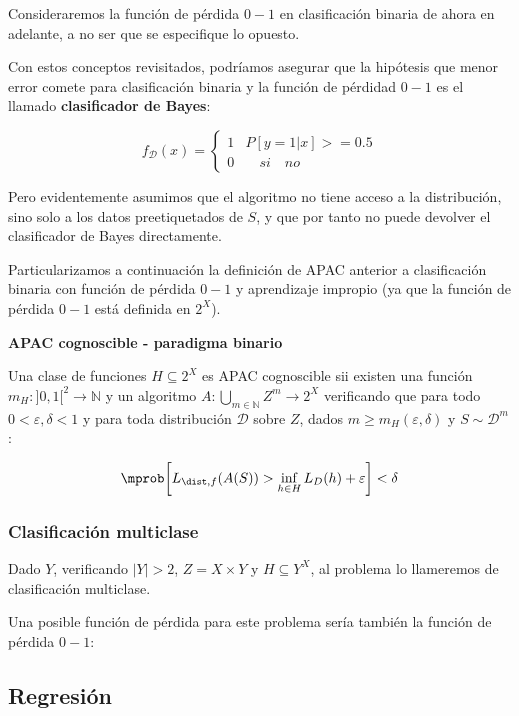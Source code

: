 Consideraremos la función de pérdida $0-1$ en clasificación binaria de ahora en adelante, a no ser que se especifique
lo opuesto.

Con estos conceptos revisitados, podríamos asegurar que la hipótesis que menor error comete para 
clasificación binaria y la función de pérdidad $0-1$ es el llamado \textbf{clasificador de Bayes}:

\[f_{\mathcal{D}}(x) = \left\{\begin{array}{ll}
1 & P [y = 1 |x] >= 0.5\\
0 & \quad si \quad no
\end{array}\right.\]

Pero evidentemente asumimos que el algoritmo no tiene acceso a la distribución, sino solo a los datos 
preetiquetados de $S$, y que por tanto no puede devolver el clasificador de Bayes directamente.

Particularizamos a continuación la definición de APAC anterior a clasificación binaria
con función de pérdida $0-1$ y aprendizaje impropio (ya que la función de pérdida $0-1$ está definida 
en $2^X$).

\begin{definition} \textbf{APAC cognoscible - paradigma binario}

Una clase de funciones $H \subseteq 2^X$ es APAC cognoscible sii existen una función 
$m_{H} : ]0,1[^2\rightarrow \mathbb{N}$ y un algoritmo $A: \underset{m\in \mathbb{N}}{\bigcup} Z^m \rightarrow 2^X$ verificando que para todo
$0 < \varepsilon, \delta < 1$ y para toda distribución $\mathcal{D}$ sobre $Z$, dados 
$m \ge m_H(\varepsilon, \delta)$ y $S\sim \mathcal{D}^m$:

\[\mprob \bigg[L_{\dist,f}(A(S)) > \inf_{h\in H} L_D(h) + \varepsilon \bigg] < \delta \]
\end{definition}

\subsubsection{Clasificación multiclase}

Dado $Y$, verificando $|Y| > 2$, $Z=X\times Y$ y $H\subseteq Y^X$, al problema lo llameremos de 
clasificación multiclase. 

Una posible función de pérdida para este problema sería también la función de pérdida $0-1$:

\subsection{Regresión}

